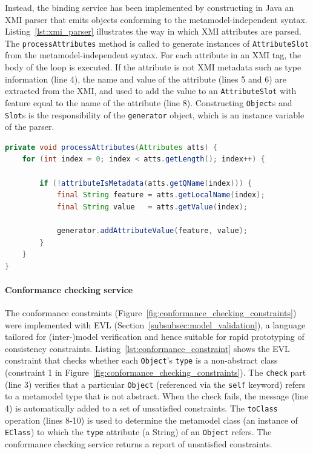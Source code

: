 Instead, the binding service has been implemented by constructing in Java an XMI parser that emits objects conforming to the metamodel-independent syntax. Listing~\ref{lst:xmi_parser} illustrates the way in which XMI attributes are parsed. The \texttt{pr\-oc\-e\-ssAtt\-rib\-ut\-es} method is called to generate instances of \texttt{At\-tr\-ibu\-teSl\-ot} from the metamodel-independent syntax. For each attribute in an XMI tag, the body of the loop is executed. If the attribute is not XMI metadata such as type information (line 4), the name and value of the attribute (lines 5 and 6) are extracted from the XMI, and used to add the value to an \texttt{At\-tr\-ibu\-teSl\-ot} with feature equal to the name of the attribute (line 8). Constructing \texttt{O\-bj\-e\-ct}s and \texttt{Sl\-ot}s is the responsibility of the \texttt{ge\-ne\-ra\-tor} object, which is an instance variable of the parser.


\begin{lstlisting}[caption=Parsing XMI attributes (in Java), label=lst:xmi_parser, language=Java]
private void processAttributes(Attributes atts) {
	for (int index = 0; index < atts.getLength(); index++) {
		
		if (!attributeIsMetadata(atts.getQName(index))) {
			final String feature = atts.getLocalName(index);
			final String value   = atts.getValue(index);
			
			generator.addAttributeValue(feature, value);
		}
	}
}
\end{lstlisting}

\paragraph{Conformance checking service} The conformance constraints (Figure~\ref{fig:conformance_checking_constraints}) were implemented with EVL (Section~\ref{subsubsec:model_validation}), a language tailored for (inter-)model verification and hence suitable for rapid prototyping of consistency constraints. Listing~\ref{lst:conformance_constraint} shows the EVL constraint that checks whether each \texttt{Ob\-je\-ct}'s \texttt{ty\-pe} is a non-abstract class (constraint 1 in Figure~\ref{fig:conformance_checking_constraints}). The \texttt{ch\-e\-ck} part (line 3) verifies that a particular \texttt{Ob\-je\-ct} (referenced via the \texttt{se\-lf} keyword) refers to a metamodel type that is not abstract. When the check fails, the message (line 4) is automatically added to a set of unsatisfied constraints. The \texttt{toCl\-a\-ss} operation (lines 8-10) is used to determine the metamodel class (an instance of \texttt{EClass}) to which the \texttt{type} attribute (a String) of an \texttt{Ob\-je\-ct} refers. The conformance checking service returns a report of unsatisfied constraints.

